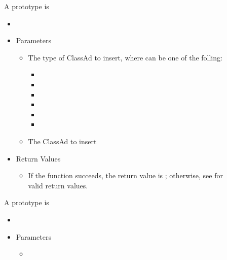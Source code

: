 
\begin{description}
\item []
  A prototype is 

  \begin{itemize}
    \item[] 
    \item[] Parameters
    \begin{itemize}
      \item[] 
      
      The type of ClassAd to insert, where  can be one of the
      folling:


      \begin{itemize}
        \item[] 
        \item[]  
        \item[] 
        \item[] 
        \item[] 
        \item[] 
      \end{itemize}

      \item[]  

      The ClassAd to insert
    \end{itemize}
    \item[] Return Values
    \begin{itemize}
      \item[] If the function succeeds, the return value is ; 
      otherwise, see  for valid return values.
    \end{itemize}
  \end{itemize}

\item []
  A prototype is 

  \begin{itemize}
    \item[] 
    \item[] Parameters
    \begin{itemize}
      \item[]  


\end{itemize}
\end{itemize}
\end{description}
